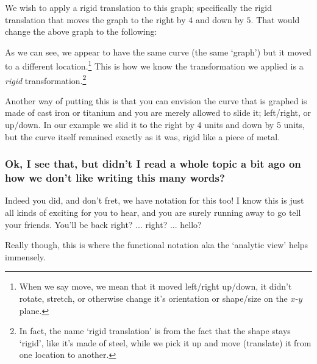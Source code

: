 \documentclass{ximeraXloud}
\begin{document}
    We wish to apply a rigid translation to this graph; specifically the rigid translation that moves the graph to the right by $4$ and down by $5$. That would change the above graph to the following:
    
    \begin{minipage}{\textwidth}
        \begin{center}
        \end{center}
    \end{minipage}
    
    As we can see, we appear to have the same curve (the same `graph') but it moved to a different location.\footnote{%
        When we say move, we mean that it moved left/right up/down, it didn't rotate, stretch, or otherwise change it's orientation or shape/size on the $x$-$y$ plane.%
        } 
    This is how we know the transformation we applied is a \textit{rigid} transformation.\footnote{%
        In fact, the name `rigid translation' is from the fact that the shape stays `rigid', like it's made of steel, while we pick it up and move (translate) it from one location to another.%
        }
    
    Another way of putting this is that you can envision the curve that is graphed is made of cast iron or titanium and you are merely allowed to slide it; left/right, or up/down. In our example we slid it to the right by $4$ units and down by $5$ units, but the curve itself remained exactly as it was, rigid like a piece of metal.

    \subsubsection*{Ok, I see that, but didn't I read a whole topic a bit ago on how we don't like writing this many words?}
        Indeed you did, and don't fret, we have notation for this too! I know this is just all kinds of exciting for you to hear, and you are surely running away to go tell your friends. You'll be back right? ... right? ... hello?
        
        Really though, this is where the functional notation aka the `analytic view' helps immensely.



    
    
    
\end{document}
